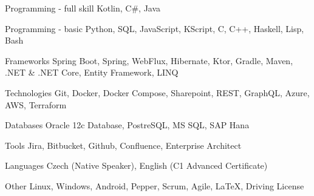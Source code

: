 
\begin{cvskills}

\cvskill
{Programming - full skill}
{Kotlin, C\#, Java}

\cvskill
{Programming - basic}
{Python, SQL, JavaScript, KScript, C, C++, Haskell, Lisp, Bash}

\cvskill
{Frameworks}
{Spring Boot, Spring, WebFlux, Hibernate, Ktor, Gradle, Maven, .NET \& .NET Core, Entity Framework, LINQ}

\cvskill
{Technologies}
{Git, Docker, Docker Compose, Sharepoint, REST, GraphQL, Azure, AWS, Terraform}

\cvskill
{Databases}
{Oracle 12c Database, PostreSQL, MS SQL, SAP Hana}

\cvskill
{Tools}
{Jira, Bitbucket, Github, Confluence, Enterprise Architect}

\cvskill
{Languages}
{Czech (Native Speaker), English (C1 Advanced Certificate)}

\cvskill
{Other}
{Linux, Windows, Android, Pepper, Scrum, Agile, LaTeX, Driving License}

\end{cvskills}